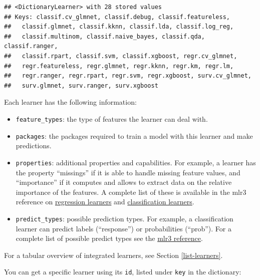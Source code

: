\documentclass[]{scrbook}
\newenvironment{Shaded}{\begin{snugshade}}{\end{snugshade}}
\newcommand{\KeywordTok}[1]{\textcolor[rgb]{0.13,0.29,0.53}{\textbf{#1}}}
\newcommand{\NormalTok}[1]{#1}
\newcommand{\OperatorTok}[1]{\textcolor[rgb]{0.81,0.36,0.00}{\textbf{#1}}}
\newcommand{\StringTok}[1]{\textcolor[rgb]{0.31,0.60,0.02}{#1}}
\providecommand{\tightlist}{%
  \setlength{\itemsep}{0pt}\setlength{\parskip}{0pt}}
\renewenvironment{Shaded} {\begin{snugshade}\small} {\end{snugshade}}
\begin{document}
\begin{verbatim}
## <DictionaryLearner> with 28 stored values
## Keys: classif.cv_glmnet, classif.debug, classif.featureless,
##   classif.glmnet, classif.kknn, classif.lda, classif.log_reg,
##   classif.multinom, classif.naive_bayes, classif.qda, classif.ranger,
##   classif.rpart, classif.svm, classif.xgboost, regr.cv_glmnet,
##   regr.featureless, regr.glmnet, regr.kknn, regr.km, regr.lm,
##   regr.ranger, regr.rpart, regr.svm, regr.xgboost, surv.cv_glmnet,
##   surv.glmnet, surv.ranger, surv.xgboost
\end{verbatim}

Each learner has the following information:

\begin{itemize}
\tightlist
\item
  \texttt{feature\_types}: the type of features the learner can deal with.
\item
  \texttt{packages}: the packages required to train a model with this learner and make predictions.
\item
  \texttt{properties}: additional properties and capabilities.
  For example, a learner has the property ``missings'' if it is able to handle missing feature values, and ``importance'' if it computes and allows to extract data on the relative importance of the features.
  A complete list of these is available in the mlr3 reference on \href{https://mlr3.mlr-org.com/reference/LearnerRegr.html\#construction}{regression learners} and \href{https://mlr3.mlr-org.com/reference/LearnerClassif.html\#construction}{classification learners}.
\item
  \texttt{predict\_types}: possible prediction types. For example, a classification learner can predict labels (``response'') or probabilities (``prob''). For a complete list of possible predict types see the \href{https://mlr3.mlr-org.com/reference/Learner.html\#construction}{mlr3 reference}.
\end{itemize}

For a tabular overview of integrated learners, see Section \ref{list-learners}.

You can get a specific learner using its \texttt{id}, listed under \texttt{key} in the dictionary:

\begin{Shaded}
\end{Shaded}
\end{document}

